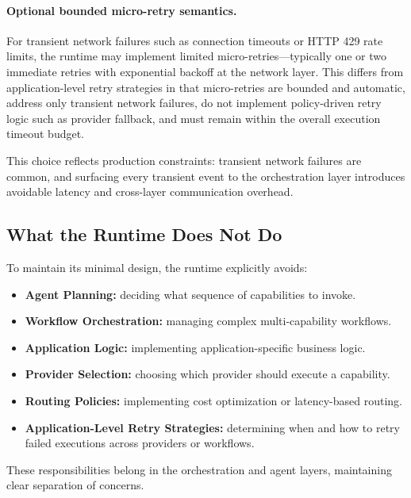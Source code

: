 \paragraph{Optional bounded micro-retry semantics.}
For transient network failures such as connection timeouts or HTTP 429 rate limits, the runtime may implement limited micro-retries---typically one or two immediate retries with exponential backoff at the network layer. This differs from application-level retry strategies in that micro-retries are bounded and automatic, address only transient network failures, do not implement policy-driven retry logic such as provider fallback, and must remain within the overall execution timeout budget.

This choice reflects production constraints: transient network failures are common, and surfacing every transient event to the orchestration layer introduces avoidable latency and cross-layer communication overhead.

\subsection{What the Runtime Does Not Do}
\label{subsec:runtime-non-responsibilities}

To maintain its minimal design, the runtime explicitly avoids:

\begin{itemize}[leftmargin=1.5em]
    \item \textbf{Agent Planning:} deciding what sequence of capabilities to invoke.
    \item \textbf{Workflow Orchestration:} managing complex multi-capability workflows.
    \item \textbf{Application Logic:} implementing application-specific business logic.
    \item \textbf{Provider Selection:} choosing which provider should execute a capability.
    \item \textbf{Routing Policies:} implementing cost optimization or latency-based routing.
    \item \textbf{Application-Level Retry Strategies:} determining when and how to retry failed executions across providers or workflows.
\end{itemize}

These responsibilities belong in the orchestration and agent layers, maintaining clear separation of concerns.

